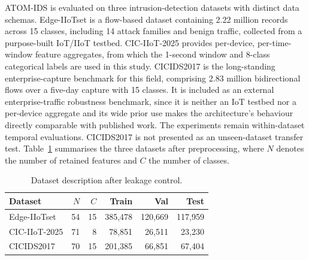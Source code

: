 \documentclass[10pt,letterpaper,twocolumn]{article}
\begin{document}
ATOM-IDS is evaluated on three intrusion-detection datasets with distinct data
schemas. Edge-IIoTset \cite{ferrag2022edgeiiotset} is a flow-based dataset
containing 2.22 million records across 15 classes, including 14 attack families
and benign traffic, collected from a purpose-built IoT/IIoT testbed.
CIC-IIoT-2025 \cite{firouzi2025datasense} provides per-device, per-time-window
feature aggregates, from which the 1-second window and 8-class categorical
labels are used in this study. CICIDS2017 \cite{sharafaldin2018cicids} is the
long-standing enterprise-capture benchmark for this field, comprising 2.83
million bidirectional flows over a five-day capture with 15 classes. It is
included as an external enterprise-traffic robustness benchmark, since it is
neither an IoT testbed nor a per-device aggregate and its wide prior use makes
the architecture's behaviour directly comparable with published work. The
experiments remain within-dataset temporal evaluations. CICIDS2017 is not
presented as an unseen-dataset transfer test.
Table~\ref{tab:datasets} summarises the three datasets after preprocessing,
where $N$ denotes the number of retained features and $C$ the number of
classes.

\begin{table}[!ht]
\centering
\caption{Dataset description after leakage control.}
\label{tab:datasets}
\begin{tabular}{lrrrrr}
\toprule
Dataset & $N$ & $C$ & Train & Val & Test \\
\midrule
Edge-IIoTset  & 54 & 15 & 385,478 & 120,669 & 117,959 \\
CIC-IIoT-2025 & 71 &  8 &  78,851 &  26,511 &  23,230 \\
CICIDS2017    & 70 & 15 & 201,385 &  66,851 &  67,404 \\
\bottomrule
\end{tabular}
\end{table}
\end{document}
